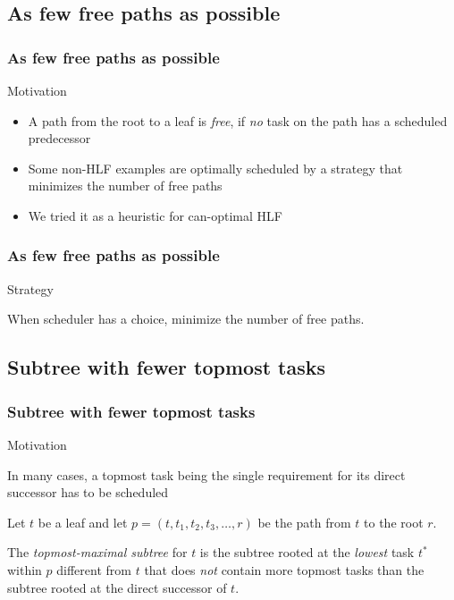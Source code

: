 \documentclass{beamer}
\newenvironment{strategyblock}
{
  \begin{block}{Strategy}
}
{
  \end{block}
}
\newenvironment{motivationblock}
{
  \begin{block}{Motivation}
}
{
  \end{block}
}
\newcommand{\todo}[1]{ {\color{red}{#1} }}
\begin{document}
\subsection{As few free paths as possible}

\begin{frame}
  \frametitle{As few free paths as possible}
  \begin{motivationblock}
    \begin{itemize}
    \item A path from the root to a leaf is \emph{free}, if \emph{no} task on the path has a scheduled predecessor
    \item Some non-HLF examples are optimally scheduled by a strategy that minimizes the number of free paths
    \item We tried it as a heuristic for can-optimal HLF
    \end{itemize}
  \end{motivationblock}
  \todo{Kurzes Bild}
\end{frame}

\begin{frame}
  \frametitle{As few free paths as possible}
  \begin{strategyblock}
    When scheduler has a choice, minimize the number of free paths.
  \end{strategyblock}
  \todo{Bild.}
\end{frame}

\subsection{Subtree with fewer topmost tasks}

\begin{frame}
  \frametitle{Subtree with fewer topmost tasks}
  \begin{motivationblock}
    In many cases, a topmost task being the single requirement for its direct successor has to be scheduled
  \end{motivationblock}
  \begin{definition}
    Let $t$ be a leaf and let $p=(t, t_1, t_2, t_3, \dots, r)$ be the path from $t$ to the root $r$.

    The \emph{topmost-maximal subtree} for $t$ is the subtree rooted at the \emph{lowest} task $t^*$ within $p$ different from $t$ that does \emph{not} contain more topmost tasks than the subtree rooted at the direct successor of $t$. 
  \end{definition}
\end{frame}
\end{document}
